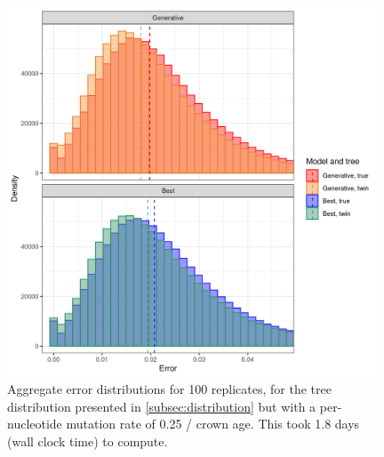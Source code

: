 \begin{figure}[H]
  \includegraphics[width=0.98\textwidth]{pirouette_example_35/errors.png}
  \caption{Aggregate error distributions for 100 replicates,
    for the tree distribution presented 
    in \ref{subsec:distribution} but with a per-nucleotide mutation rate 
    of 0.25 / crown age. 
    This took 1.8 days (wall clock time) to compute.}
  \label{fig:example_0.25_mutation_rate}
\end{figure}

